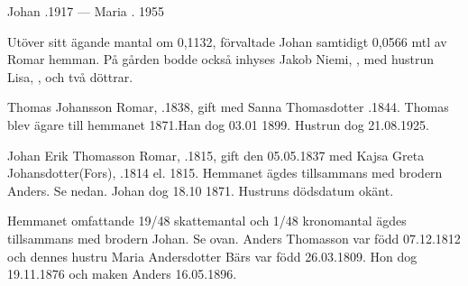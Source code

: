 Johan .1917  ---  Maria . 1955

Utöver sitt ägande mantal om 0,1132, förvaltade Johan samtidigt 0,0566 mtl av Romar hemman. På gården bodde också inhyses Jakob Niemi, , med hustrun Lisa, , och två döttrar.


Thomas Johansson Romar, .1838, gift med Sanna Thomasdotter .1844.
Thomas blev ägare till hemmanet 1871.Han dog 03.01 1899. Hustrun dog 21.08.1925.
\begin{jhchildren}
  \item {}
  \item {}
  \item {}
  \item {}
  \item {}
  \item {}
  \item {}
  \item {}
\end{jhchildren}


Johan Erik Thomasson Romar, .1815, gift den 05.05.1837 med Kajsa Greta Johansdotter(Fors), .1814 el. 1815.
Hemmanet ägdes tillsammans med brodern Anders. Se nedan. Johan dog 18.10 1871. Hustruns dödsdatum okänt.
\begin{jhchildren}
  \item {}
  \item {}
  \item {}
  \item {}
\end{jhchildren}


Hemmanet omfattande 19/48 skattemantal och 1/48 kronomantal ägdes tillsammans med brodern Johan. Se ovan. Anders Thomasson var född 07.12.1812 och dennes hustru Maria Andersdotter Bärs var född 26.03.1809. Hon dog 19.11.1876 och maken Anders 16.05.1896.
\begin{jhchildren}
  \item {}
  \item {}
\end{jhchildren}


